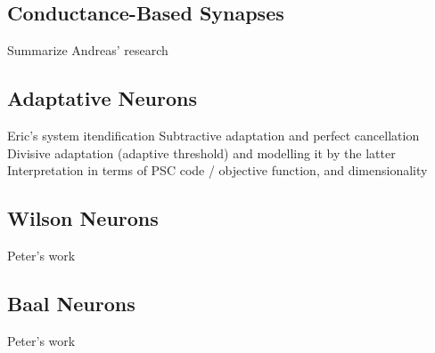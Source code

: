 \subsection{Conductance-Based Synapses}

Summarize Andreas' research

\subsection{Adaptative Neurons}

Eric's system itendification
Subtractive adaptation and perfect cancellation
Divisive adaptation (adaptive threshold) and modelling it by the latter
Interpretation in terms of PSC code / objective function, and dimensionality

\subsection{Wilson Neurons}

Peter's work

\subsection{Baal Neurons}

Peter's work
